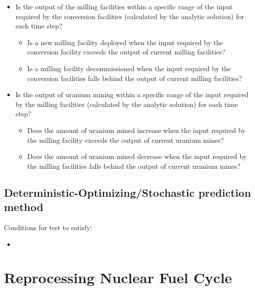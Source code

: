 \documentclass[12pt,letterpaper]{article}
\begin{document}
\begin{itemize}
\begin{itemize}
\end{itemize}
\item Is the output of the milling facilities within a specific range of the input required by the conversion facilities (calculated by the analytic solution) for each time step? 
\begin{itemize}
\item Is a new milling facility deployed when the input required by the conversion facility exceeds the output of current milling facilities?
\item Is a milling facility decommissioned when the input required by the conversion facilities falls behind the output of current milling facilities?
\end{itemize}
\item Is the output of uranium mining within a specific range of the input required by the milling facilities (calculated by the analytic solution) for each time step? 
\begin{itemize}
\item Does the amount of uranium mined increase when the input required by the milling facility exceeds the output of current uranium mines?
\item Does the amount of uranium mined decrease when the input required by the milling facilities falls behind the output of current uranium mines?
\end{itemize}
\end{itemize}

\subsection*{Deterministic-Optimizing/Stochastic prediction method}
Conditions for test to satisfy: 
\begin{itemize}
\item 
\end{itemize}


\section{Reprocessing Nuclear Fuel Cycle}
\end{document}

